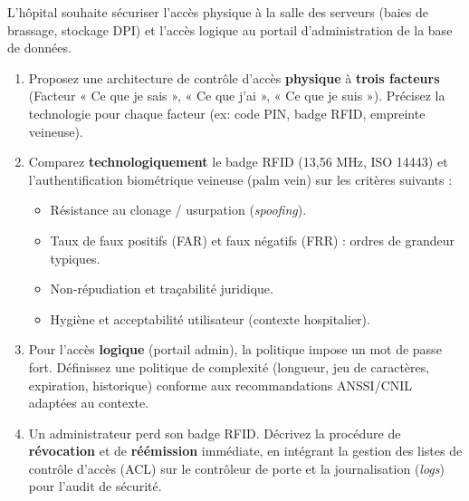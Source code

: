 \documentclass[11pt]{article}
\begin{document}
\begin{exercice}
\label{exo:access_control}
L'hôpital souhaite sécuriser l'accès physique à la salle des serveurs (baies de brassage, stockage DPI) et l'accès logique au portail d'administration de la base de données.
\begin{enumerate}
    \item Proposez une architecture de contrôle d'accès \textbf{physique} à \textbf{trois facteurs} (Facteur « Ce que je sais », « Ce que j'ai », « Ce que je suis »). Précisez la technologie pour chaque facteur (ex: code PIN, badge RFID, empreinte veineuse).
    \item Comparez \textbf{technologiquement} le badge RFID (13,56 MHz, ISO 14443) et l'authentification biométrique veineuse (palm vein) sur les critères suivants :
    \begin{itemize}
        \item Résistance au clonage / usurpation (\textit{spoofing}).
        \item Taux de faux positifs (FAR) et faux négatifs (FRR) : ordres de grandeur typiques.
        \item Non-répudiation et traçabilité juridique.
        \item Hygiène et acceptabilité utilisateur (contexte hospitalier).
    \end{itemize}
    \item Pour l'accès \textbf{logique} (portail admin), la politique impose un mot de passe fort. Définissez une politique de complexité (longueur, jeu de caractères, expiration, historique) conforme aux recommandations ANSSI/CNIL adaptées au contexte.
    \item Un administrateur perd son badge RFID. Décrivez la procédure de \textbf{révocation} et de \textbf{réémission} immédiate, en intégrant la gestion des listes de contrôle d'accès (ACL) sur le contrôleur de porte et la journalisation (\textit{logs}) pour l'audit de sécurité.
\end{enumerate}
\end{exercice}
\end{document}

